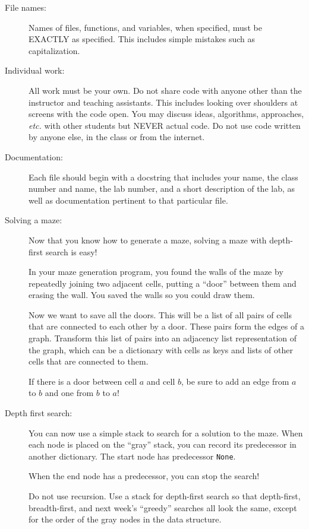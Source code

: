 \documentclass{article}
\begin{document}
\begin{description}

\item[File names:]  Names of files, functions, and variables, 
when specified,
must be EXACTLY as specified.  This includes simple mistakes such
as capitalization.

\item[Individual work:]  All work must be your own.  Do not share
code with anyone other than the instructor and teaching assistants.
This includes looking over shoulders at screens with the code open.
You may discuss ideas, algorithms, approaches, {\em etc.} with
other students but NEVER actual code.  Do not use code
written by anyone else, in the class or from the internet.

\item[Documentation:] Each file should begin with a docstring
that includes your name, the class number and name, the lab
number, and  
a short description of the lab, as well as documentation pertinent
to that particular file.

  
\item[Solving a maze:]  Now that you know how to generate a maze,
solving a maze with depth-first search is easy!

In your maze generation program, you found the walls of the maze
by repeatedly joining two adjacent cells, putting a ``door'' between
them and erasing the wall.  You saved the walls so you could draw 
them.

Now we want to save all the doors.  This will be a list of all pairs
of cells that are connected to each other by a door.  These
pairs form the edges of a graph.  Transform
this list of pairs into an adjacency list representation of the graph,
which can be a dictionary with cells as keys and lists of other
cells that are connected to them.

If there is a door between cell $a$ and cell $b$, be sure to 
add an edge from $a$ to $b$ and one from $b$ to $a$!

\item[Depth first search:]  You can now use a simple stack
to search for a solution to the maze.  When each node is
placed on the ``gray'' stack, you can record its predecessor
in another dictionary.  The start node has predecessor {\tt None}.

When the end node has a predecessor, you can stop
the search!

Do not use recursion.  Use a stack for depth-first search
so that depth-first, breadth-first, and next week's ``greedy''
searches all look the same, except for the order of
the gray nodes in the data structure.


\end{description}
\end{document}
